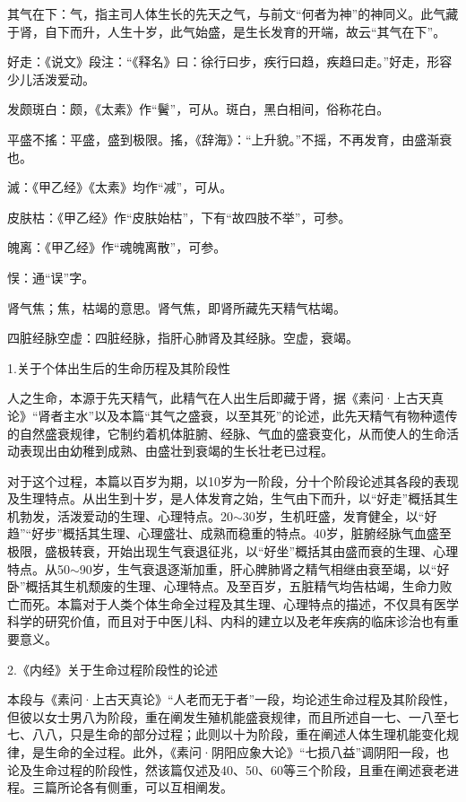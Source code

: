 \documentclass[draft,12pt]{ctexbook}
\begin{document}
\begin{jiaozhu}
	\item 其气在下：气，指主司人体生长的先天之气，与前文“何者为神”的神同义。此气藏于肾，自下而升，人生十岁，此气始盛，是生长发育的开端，故云“其气在下”。
	\item 好走：《说文》段注：“《释名》曰：徐行曰步，疾行曰趋，疾趋曰走。”好走，形容少儿活泼爱动。
	\item 发颇斑白：颇，《太素》作“鬢”，可从。斑白，黑白相间，俗称花白。
	\item 平盛不搖：平盛，盛到极限。搖，《辞海》：“上升貌。”不摇，不再发育，由盛渐衰也。
	\item 滅：《甲乙经》《太素》均作“减”，可从。
	\item 皮肤枯：《甲乙经》作“皮肤始枯”，下有“故四肢不举”，可参。
	\item 魄离：《甲乙经》作“魂魄离散”，可参。
	\item 悮：通“误”字。
	\item 肾气焦；焦，枯竭的意思。肾气焦，即肾所藏先天精气枯竭。
	\item 四脏经脉空虚：四脏经脉，指肝心肺肾及其经脉。空虚，衰竭。
\end{jiaozhu}


1.关于个体出生后的生命历程及其阶段性

人之生命，本源于先天精气，此精气在人出生后即藏于肾，据《素问·上古天真论》“肾者主水”以及本篇“其气之盛衰，以至其死”的论述，此先天精气有物种遗传的自然盛衰规律，它制约着机体脏腑、经脉、气血的盛衰变化，从而使人的生命活动表现出由幼稚到成熟、由盛壮到衰竭的生长壮老已过程。

对于这个过程，本篇以百岁为期，以10岁为一阶段，分十个阶段论述其各段的表现及生理特点。从出生到十岁，是人体发育之始，生气由下而升，以“好走”概括其生机勃发，活泼爱动的生理、心理特点。20$\sim$30岁，生机旺盛，发育健全，以“好趋”“好步”概括其生理、心理盛壮、成熟而稳重的特点。40岁，脏腑经脉气血盛至极限，盛极转衰，开始出现生气衰退征兆，以“好坐”概括其由盛而衰的生理、心理特点。从50$\sim$90岁，生气衰退逐渐加重，肝心脾肺肾之精气相继由衰至竭，以“好卧”概括其生机颓废的生理、心理特点。及至百岁，五脏精气均告枯竭，生命力败亡而死。本篇对于人类个体生命全过程及其生理、心理特点的描述，不仅具有医学科学的研究价值，而且对于中医儿科、内科的建立以及老年疾病的临床诊治也有重要意义。

2.《内经》关于生命过程阶段性的论述

本段与《素问·上古天真论》“人老而无于者”一段，均论述生命过程及其阶段性，但彼以女士男八为阶段，重在阐发生殖机能盛衰规律，而且所述自一七、一八至七七、八八，只是生命的部分过程；此则以十为阶段，重在阐述人体生理机能变化规律，是生命的全过程。此外，《素问·阴阳应象大论》“七损八益”调阴阳一段，也论及生命过程的阶段性，然该篇仅述及40、50、60等三个阶段，且重在阐述衰老进程。三篇所论各有侧重，可以互相阐发。
\end{document}
